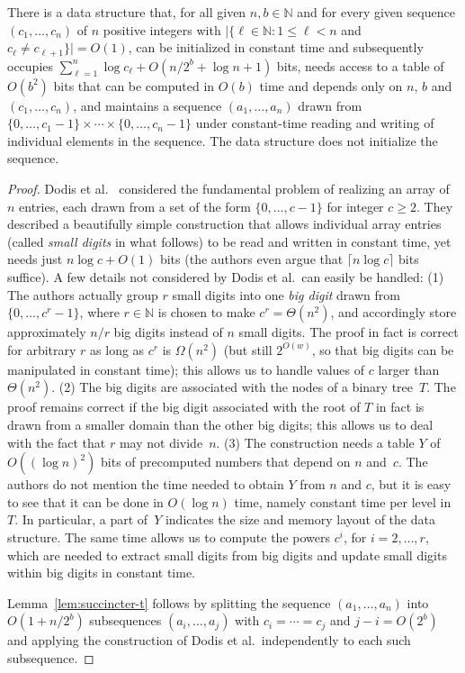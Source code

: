 \documentclass[envcountsame,envcountsect,undated,nolinenumbers]{lnthi}
\def\Tceil#1{\lceil #1\rceil}
\def\TbbbN{\mathbb{N}}
\begin{document}
\begin{lemma}
\label{lem:succincter-t}There is a data structure
that, for all given $n,b\in\TbbbN$
and for every given sequence
$(c_1,\ldots,c_n)$ of $n$ positive integers
with $|\{\ell\in\TbbbN:1\le\ell<n$ and
$c_\ell\not= c_{\ell+1}\}|=O(1)$,
can be initialized in constant time and subsequently
occupies $\sum_{\ell=1}^n\log c_\ell+O({n/{2^b}}+\log n+1)$ bits,
needs access to a table of $O(b^2)$ bits
that can be computed in $O(b)$ time and
depends only on $n$, $b$
and $(c_1,\ldots,c_n)$,
and maintains a sequence
$(a_1,\ldots,a_n)$ 
drawn from
$\{0,\ldots,c_1-1\}\times\cdots\times\{0,\ldots,c_n-1\}$
under constant-time reading and writing
of individual elements in the sequence.
The data structure does not initialize the sequence.
\end{lemma}

\begin{proof}
Dodis et al.~\cite{DodPT10}
considered the fundamental problem of
realizing an array of $n$ entries,
each drawn from a set of the
form $\{0,\ldots,c-1\}$
for integer $c\ge 2$.
They
described a beautifully simple
construction that allows individual array entries
(called \emph{small digits} in what follows) to
be read and written in constant time, yet needs
just $n\log c+O(1)$ bits
(the authors even argue that
$\Tceil{n\log c}$ bits suffice).
A few details not considered by
Dodis et al.\ can easily be handled:
(1) The authors actually group $r$ small
digits into one
\emph{big digit} drawn from
$\{0,\ldots,c^r-1\}$, where
$r\in\TbbbN$ is chosen to make
$c^r=\Theta(n^2)$, and accordingly store
approximately $n/r$ big digits
instead of $n$ small digits.
The proof in fact is correct for arbitrary $r$
as long as $c^r$
is $\Omega(n^2)$
(but still $2^{O(w)}$, so that big
digits can be manipulated in constant time);
this allows us to handle
values of $c$ larger than $\Theta(n^2)$.
(2) The big digits are associated with the nodes
of a binary tree~$T$.
The proof remains correct if the big digit associated
with the root of $T$ in fact is drawn from a smaller domain
than the other big digits;
this allows us to deal with the fact that $r$
may not divide~$n$.
(3) The construction needs a
table $Y$ of $O((\log n)^2)$ bits
of precomputed numbers that depend on $n$ and~$c$.
The authors do not mention the time needed
to obtain
$Y$ from $n$ and $c$,
but it is easy to see that it can be done in
$O(\log n)$ time, namely constant time per
level in~$T$.
In particular,
a part of~$Y$ indicates
the size and memory layout of the data structure.
The same time allows us to compute the
powers $c^i$, for $i=2,\ldots,r$, which are needed
to extract small digits from big digits and
update small digits within big digits in
constant time.

Lemma~\ref{lem:succincter-t} follows by
splitting
the sequence
$(a_1,\ldots,a_n)$ 
into
$O(1+{n/{2^b}})$ subsequences
$(a_i,\ldots,a_j)$ with $c_i=\cdots=c_j$
and $j-i=O(2^b)$
and applying the
construction of Dodis et al.\ independently
to each such subsequence.
\end{proof}
\end{document}
